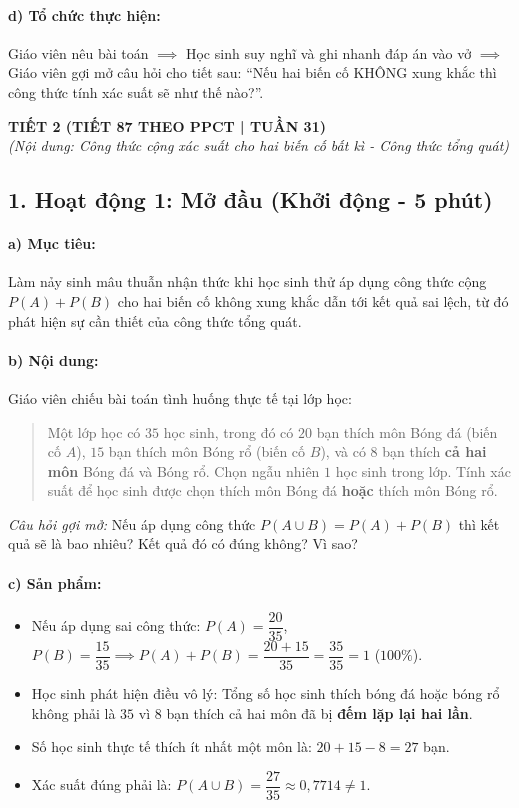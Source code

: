 \documentclass[12pt, a4paper]{article}
\begin{document}
\paragraph{d) Tổ chức thực hiện:} Giáo viên nêu bài toán $\implies$ Học sinh suy nghĩ và ghi nhanh đáp án vào vở $\implies$ Giáo viên gợi mở câu hỏi cho tiết sau: ``Nếu hai biến cố KHÔNG xung khắc thì công thức tính xác suất sẽ như thế nào?''.

\newpage

\begin{center}
    \textbf{\large TIẾT 2 (TIẾT 87 THEO PPCT | TUẦN 31)}\\[4pt]
    \textit{(Nội dung: Công thức cộng xác suất cho hai biến cố bất kì - Công thức tổng quát)}
\end{center}

\subsection*{1. Hoạt động 1: Mở đầu (Khởi động - 5 phút)}

\paragraph{a) Mục tiêu:} Làm nảy sinh mâu thuẫn nhận thức khi học sinh thử áp dụng công thức cộng $P(A) + P(B)$ cho hai biến cố không xung khắc dẫn tới kết quả sai lệch, từ đó phát hiện sự cần thiết của công thức tổng quát.

\paragraph{b) Nội dung:} Giáo viên chiếu bài toán tình huống thực tế tại lớp học:
\begin{quote}
Một lớp học có $35$ học sinh, trong đó có $20$ bạn thích môn Bóng đá (biến cố $A$), $15$ bạn thích môn Bóng rổ (biến cố $B$), và có $8$ bạn thích \textbf{cả hai môn} Bóng đá và Bóng rổ. Chọn ngẫu nhiên $1$ học sinh trong lớp.
Tính xác suất để học sinh được chọn thích môn Bóng đá \textbf{hoặc} thích môn Bóng rổ.
\end{quote}
\textit{Câu hỏi gợi mở:} Nếu áp dụng công thức $P(A \cup B) = P(A) + P(B)$ thì kết quả sẽ là bao nhiêu? Kết quả đó có đúng không? Vì sao?

\paragraph{c) Sản phẩm:}
\begin{itemize}[leftmargin=0.8cm]
    \item Nếu áp dụng sai công thức: $P(A) = \dfrac{20}{35}$, $P(B) = \dfrac{15}{35} \implies P(A) + P(B) = \dfrac{20 + 15}{35} = \dfrac{35}{35} = 1$ ($100\%$).
    \item Học sinh phát hiện điều vô lý: Tổng số học sinh thích bóng đá hoặc bóng rổ không phải là $35$ vì $8$ bạn thích cả hai môn đã bị \textbf{đếm lặp lại hai lần}.
    \item Số học sinh thực tế thích ít nhất một môn là: $20 + 15 - 8 = 27$ bạn.
    \item Xác suất đúng phải là: $P(A \cup B) = \dfrac{27}{35} \approx 0{,}7714 \neq 1$.
\end{itemize}
\end{document}

